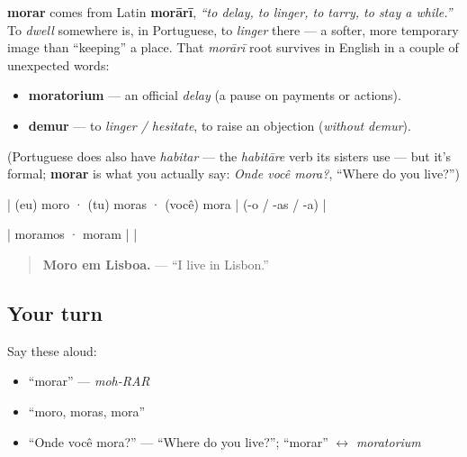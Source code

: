 \begin{cousinweb}
\textbf{morar} comes from Latin \textbf{morārī}, \emph{\textquotedblleft{}to delay, to linger, to tarry, to stay a while.\textquotedblright{}} To \emph{dwell} somewhere is, in Portuguese, to \emph{linger} there — a softer, more temporary image than \textquotedblleft{}keeping\textquotedblright{} a place. That \emph{morārī} root survives in English in a couple of unexpected words:

\begin{itemize}
\raggedright
  \item \textbf{moratorium} — an official \emph{delay} (a pause on payments or actions).
  \item \textbf{demur} — to \emph{linger / hesitate}, to raise an objection (\emph{without demur}).
\end{itemize}

(Portuguese does also have \emph{habitar} — the \emph{habitāre} verb its sisters use — but it's formal; \textbf{morar} is what you actually say: \emph{Onde você mora?}, \textquotedblleft{}Where do you live?\textquotedblright{})
\end{cousinweb}

\begin{grammarlens}[title={Grammar Lens: same -ar template}]
| (eu) moro · (tu) moras · (você) mora | (-o / -as / -a) |

| moramos · moram |  |

\begin{quote}
\textbf{Moro em Lisboa.} — \textquotedblleft{}I live in Lisbon.\textquotedblright{}
\end{quote}
\end{grammarlens}

\subsection*{Your turn}
Say these aloud:

\begin{itemize}
\raggedright
  \item \textquotedblleft{}morar\textquotedblright{} — \emph{moh-RAR}
  \item \textquotedblleft{}moro, moras, mora\textquotedblright{}
  \item \textquotedblleft{}Onde você mora?\textquotedblright{} — \textquotedblleft{}Where do you live?\textquotedblright{}; \textquotedblleft{}morar\textquotedblright{} $\leftrightarrow$ \emph{moratorium}
\end{itemize}


